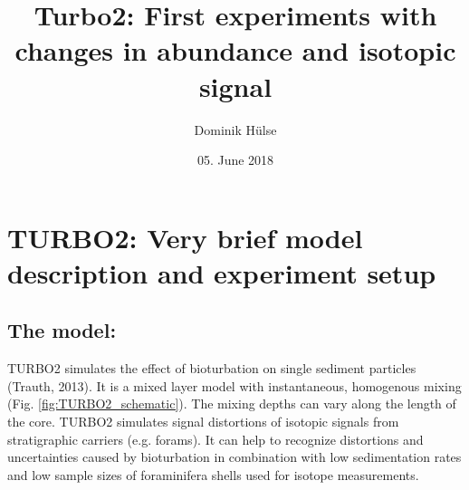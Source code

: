 \documentclass[a4paper,oneside,9pt]{article}
\begin{document}
\pagestyle{plain} %



\title{Turbo2: First experiments with changes in abundance and isotopic signal}
\author{Dominik H\"ulse} %
\date{05. June 2018} %
\maketitle


\section{TURBO2: Very brief model description and experiment setup}\label{Intro_TURBO2} %
\subsection{The model:}
TURBO2 simulates the effect of bioturbation on single sediment particles (Trauth, 2013). It is a mixed layer model with instantaneous, homogenous mixing (Fig. \ref{fig:TURBO2_schematic}).
The mixing depths can vary along the length of the core. TURBO2 simulates signal distortions of isotopic signals from stratigraphic carriers (e.g. forams). It can help to recognize distortions and uncertainties 
caused by bioturbation in combination with low sedimentation rates and low sample sizes of foraminifera shells used for isotope measurements.\\
\end{document}
